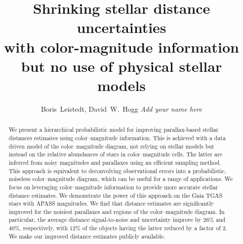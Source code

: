 \documentclass[manuscript, letterpaper]{aastex6}
\begin{document}
 
\title{Shrinking stellar distance uncertainties\\
 with color-magnitude information \\
  but no use of physical stellar models}
  


\author{
	Boris~Leistedt,
	David~W.~Hogg
	\textit{Add your name here}
	}


  
  
\begin{abstract}
We present a hierarchical probabilistic model for improving parallax-based stellar distances estimates using color--magnitude information. 
This is achieved with a data driven model of the color--magnitude diagram, not relying on stellar models but instead on the  relative abundances of stars in color--magnitude cells.
The latter are inferred from noisy magnitudes and parallaxes using an efficient sampling method.
This approach is equivalent to deconvolving observational errors into a probabilistic, noiseless color--magnitude diagram, which can be useful for a range of applications. 
We focus on leveraging color--magnitude information to provide more accurate stellar distance estimates.
We demonstrate the power of this approach on the Gaia TGAS stars with APASS magnitudes.
We find that distance estimates are significantly improved for the noisiest parallaxes and regions of the color--magnitude diagram. 
In particular, the average distance signal-to-noise and uncertainty improve by 26\% and 40\%, respectively, with 12\% of the objects having the latter reduced by a factor of 2.
We make our improved distance estimates publicly available.
\end{abstract}

\end{document}
